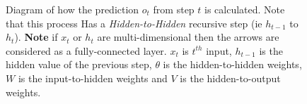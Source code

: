 \documentclass[11pt,a4paper]{article}
\begin{document}
  \begin{figure}[ht!]
    \centering
    \begin{center}\end{center}
    \caption{Diagram of how the prediction $o_t$ from step $t$ is calculated. Note that this process Has a \textit{Hidden-to-Hidden} recursive step (ie $h_{t-1}$ to $h_t$). \textbf{Note} if $x_t$ or $h_t$ are multi-dimensional then the arrows are considered as a fully-connected layer. \tiny{ $x_t$ is $t^{th}$ input, $h_{t-1}$ is the hidden value of the previous step, $\theta$ is the hidden-to-hidden weights, $W$ is the input-to-hidden weights and $V$ is the hidden-to-output weights.}}
    \label{fig:RNN}
  \end{figure}
\end{document}
